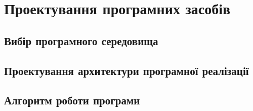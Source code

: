 \chapter{Проектування програмних засобів}
\section{Вибір програмного середовища}
\section{Проектування архитектури програмної реалізації}
\section{Алгоритм роботи програми}

